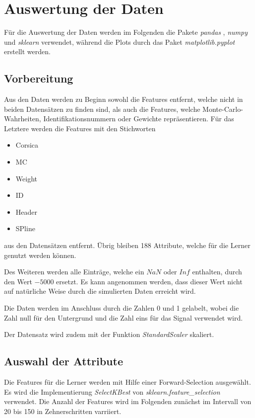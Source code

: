 \section{Auswertung der Daten}
Für die Auswertung der Daten werden im Folgenden die Pakete \textit{pandas} \cite{pandas}, \textit{numpy} \cite{numpy} und \textit{sklearn} \cite{sklearn} verwendet, während die Plots durch das Paket \textit{matplotlib.pyplot} \cite{matplotlib} erstellt werden.

\subsection{Vorbereitung}
Aus den Daten werden zu Beginn sowohl die Features entfernt, welche nicht in beiden Datensätzen zu finden sind, als auch die Features, welche Monte-Carlo-Wahrheiten, Identifikationsnummern oder Gewichte repräsentieren. Für das Letztere werden die Features mit den Stichworten
\begin{itemize}
    \item Corsica
    \item MC
    \item Weight
    \item ID
    \item Header
    \item SPline
\end{itemize}
aus den Datensätzen entfernt. Übrig bleiben 188 Attribute, welche für die Lerner genutzt werden können.

Des Weiteren werden alle Einträge, welche ein $NaN$ oder $Inf$ enthalten, durch den Wert $-5000$ ersetzt. Es kann angenommen werden, dass dieser Wert nicht auf natürliche Weise durch die simulierten Daten erreicht wird.

Die Daten werden im Anschluss durch die Zahlen 0 und 1 gelabelt, wobei die Zahl null für den Untergrund und die Zahl eins für das Signal verwendet wird.

Der Datensatz wird zudem mit der Funktion \textit{StandardScaler} skaliert.

\subsection{Auswahl der Attribute}
Die Features für die Lerner werden mit Hilfe einer Forward-Selection ausgewählt. Es wird die Implementierung \textit{SelectKBest} von \textit{sklearn.feature\_selection} verwendet. Die Anzahl der Features wird im Folgenden zunächst im Intervall von 20 bis 150 in Zehnerschritten varriiert.

